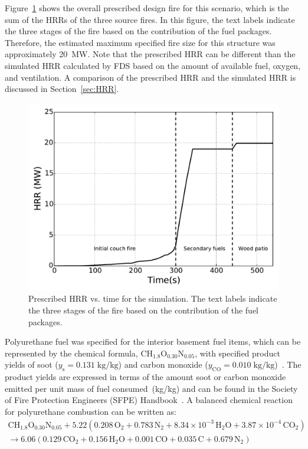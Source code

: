 \documentclass[12pt,oneside]{book}
\renewcommand{\C}{\mbox{C}}
\renewcommand{\H}{\mbox{H}}
\renewcommand{\O}{\mbox{O}}
\newcommand{\N}{\mbox{N}}
\begin{document}
\clearpage


Figure~\ref{fig:hrr} shows the overall prescribed design fire for this scenario, which is the sum of the HRRs of the three source fires. In this figure, the text labels indicate the three stages of the fire based on the contribution of the fuel packages. Therefore, the estimated maximum specified fire size for this structure was approximately 20~MW. Note that the prescribed HRR can be different than the simulated HRR calculated by FDS based on the amount of available fuel, oxygen, and ventilation. A comparison of the prescribed HRR and the simulated HRR is discussed in Section~\ref{sec:HRR}.

\begin{figure}[!ht]
\includegraphics[width=5.5in]{../Figures/Fire_HRR}
\caption[Prescribed HRR vs. time for the simulation.]
{Prescribed HRR vs. time for the simulation. The text labels indicate the three stages of the fire based on the contribution of the fuel packages.}
\label{fig:hrr}
\end{figure}

Polyurethane fuel was specified for the interior basement fuel items, which can be represented by the chemical formula, $\C\H_{1.8}\O_{0.30}\N_{0.05}$, with specified product yields of soot ($y_{\mathrm{s}}=0.131 \; \mathrm{kg}/\mathrm{kg}$) and carbon monoxide ($y_{\mathrm{CO}}=0.010 \; \mathrm{kg}/\mathrm{kg}$)~\cite{SFPE:Tewarson}. The product yields are expressed in terms of the amount soot or carbon monoxide emitted per unit mass of fuel consumed~(kg/kg) and can be found in the Society of Fire Protection Engineers (SFPE) Handbook~\cite{SFPE:Tewarson}. A balanced chemical reaction for polyurethane combustion can be written as:
\begin{multline}
\C\H_{1.8}\O_{0.30}\N_{0.05} + 5.22(0.208\,\O_{2} + 0.783\,\N_{2} + 8.34 \times 10^{-3}\,\H_{2}\O + 3.87 \times 10^{-4}\,\C\O_{2}) \\
\rightarrow 6.06(0.129\,\C\O_{2} + 0.156\,\H_{2}\O + 0.001\,\C\O + 0.035\,\C + 0.679\,\N_{2})
\label{eq:fuel_polyurethane}
\end{multline}
\end{document}
